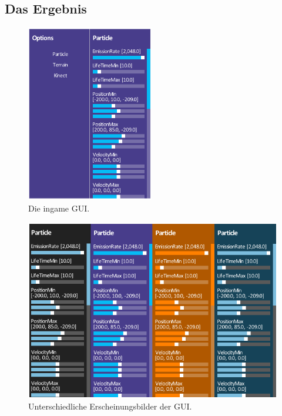 \begin{Spacing}{\mylinespace}
\begin{description}
\end{description}

\subsection{Das Ergebnis}

\begin{figure}[h!]
	\centering
	\vspace*{30px}
	\includegraphics[width=210px]{graphics/newGui.png}
	\caption{Die ingame GUI.}
	\label{fig:NewGUI}
\end{figure}

\begin{figure}[h!]
	\centering
	\vspace*{30px}
	\includegraphics[width=\columnwidth]{graphics/guiThemes.png}
	\caption{Unterschiedliche Erscheinungsbilder der GUI.}
	\label{fig:GUIThemes}
\end{figure}

\end{Spacing}
\newpage




